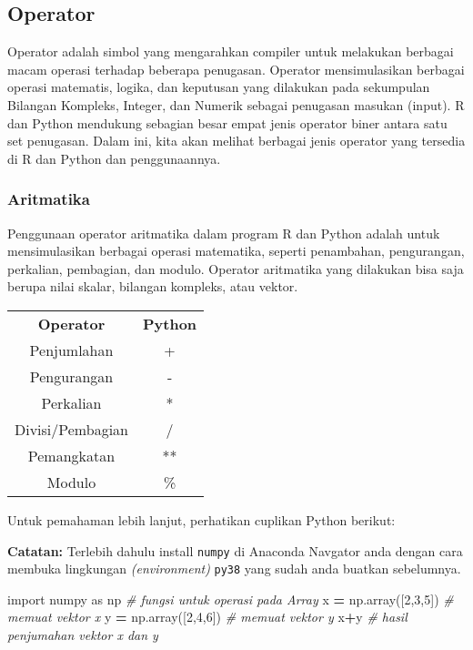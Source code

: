 \documentclass[
]{docs}
\newenvironment{Shaded}{\begin{snugshade}}{\end{snugshade}}
\newcommand{\CommentTok}[1]{\textcolor[rgb]{0.56,0.35,0.01}{\textit{#1}}}
\newcommand{\DecValTok}[1]{\textcolor[rgb]{0.00,0.00,0.81}{#1}}
\newcommand{\ImportTok}[1]{#1}
\newcommand{\NormalTok}[1]{#1}
\newcommand{\OperatorTok}[1]{\textcolor[rgb]{0.81,0.36,0.00}{\textbf{#1}}}
\begin{document}
\hypertarget{operator}{%
\subsection{Operator}\label{operator}}

Operator adalah simbol yang mengarahkan compiler untuk melakukan berbagai macam operasi terhadap beberapa penugasan. Operator mensimulasikan berbagai operasi matematis, logika, dan keputusan yang dilakukan pada sekumpulan Bilangan Kompleks, Integer, dan Numerik sebagai penugasan masukan (input). R dan Python mendukung sebagian besar empat jenis operator biner antara satu set penugasan. Dalam ini, kita akan melihat berbagai jenis operator yang tersedia di R dan Python dan penggunaannya.

\hypertarget{aritmatika}{%
\subsubsection{Aritmatika}\label{aritmatika}}

Penggunaan operator aritmatika dalam program R dan Python adalah untuk mensimulasikan berbagai operasi matematika, seperti penambahan, pengurangan, perkalian, pembagian, dan modulo. Operator aritmatika yang dilakukan bisa saja berupa nilai skalar, bilangan kompleks, atau vektor.

\begin{longtable}[]{@{}cc@{}}
\toprule()
\endhead
\textbf{Operator} & \textbf{Python} \\
Penjumlahan & + \\
Pengurangan & - \\
Perkalian & * \\
Divisi/Pembagian & / \\
Pemangkatan & ** \\
Modulo & \% \\
\bottomrule()
\end{longtable}

Untuk pemahaman lebih lanjut, perhatikan cuplikan Python berikut:

\textbf{Catatan:} Terlebih dahulu install \texttt{numpy} di Anaconda Navgator anda dengan cara membuka lingkungan \emph{(environment)} \texttt{py38} yang sudah anda buatkan sebelumnya.

\begin{Shaded}
\begin{Highlighting}[]
\ImportTok{import}\NormalTok{ numpy }\ImportTok{as}\NormalTok{ np      }\CommentTok{\# fungsi untuk operasi pada Array}
\NormalTok{x }\OperatorTok{=}\NormalTok{ np.array([}\DecValTok{2}\NormalTok{,}\DecValTok{3}\NormalTok{,}\DecValTok{5}\NormalTok{])   }\CommentTok{\# memuat vektor x}
\NormalTok{y }\OperatorTok{=}\NormalTok{ np.array([}\DecValTok{2}\NormalTok{,}\DecValTok{4}\NormalTok{,}\DecValTok{6}\NormalTok{])   }\CommentTok{\# memuat vektor y}
\NormalTok{x}\OperatorTok{+}\NormalTok{y                     }\CommentTok{\# hasil penjumahan vektor x dan y}
\end{Highlighting}
\end{Shaded}
\end{document}
